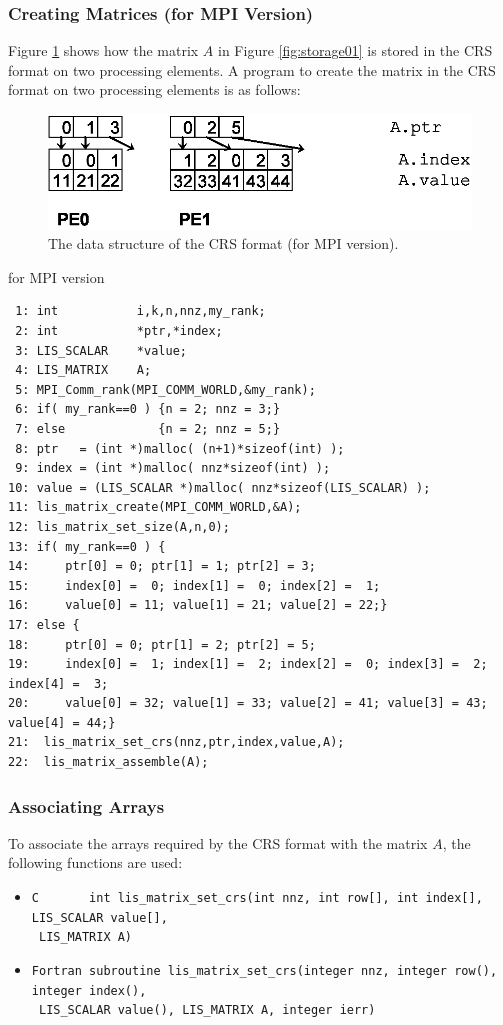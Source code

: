 \documentclass[a4paper]{article}
\begin{document}
\subsubsection{Creating Matrices (for MPI Version)}
Figure \ref{fig:storage01_mpi} shows how the matrix $A$ in 
Figure \ref{fig:storage01} is stored in the CRS format on two 
processing elements. A program to create the matrix in the CRS format 
on two processing elements is as follows:
\begin{figure}[h]
{\centering 
\includegraphics{storage01_mpi.eps} 
\caption{The data structure of the CRS format (for MPI version).}\label{fig:storage01_mpi}}
\end{figure}
\begin{itembox}[l]{for MPI version}
\small
\begin{verbatim}
 1: int           i,k,n,nnz,my_rank;
 2: int           *ptr,*index;
 3: LIS_SCALAR    *value;
 4: LIS_MATRIX    A;
 5: MPI_Comm_rank(MPI_COMM_WORLD,&my_rank);
 6: if( my_rank==0 ) {n = 2; nnz = 3;}
 7: else             {n = 2; nnz = 5;}
 8: ptr   = (int *)malloc( (n+1)*sizeof(int) );
 9: index = (int *)malloc( nnz*sizeof(int) );
10: value = (LIS_SCALAR *)malloc( nnz*sizeof(LIS_SCALAR) );
11: lis_matrix_create(MPI_COMM_WORLD,&A);
12: lis_matrix_set_size(A,n,0);
13: if( my_rank==0 ) {
14:     ptr[0] = 0; ptr[1] = 1; ptr[2] = 3;
15:     index[0] =  0; index[1] =  0; index[2] =  1;
16:     value[0] = 11; value[1] = 21; value[2] = 22;}
17: else {
18:     ptr[0] = 0; ptr[1] = 2; ptr[2] = 5;
19:     index[0] =  1; index[1] =  2; index[2] =  0; index[3] =  2; index[4] =  3;
20:     value[0] = 32; value[1] = 33; value[2] = 41; value[3] = 43; value[4] = 44;}
21:  lis_matrix_set_crs(nnz,ptr,index,value,A);
22:  lis_matrix_assemble(A);
\end{verbatim}
\end{itembox}
\subsubsection{Associating Arrays}
To associate the arrays required by the CRS format with the matrix $A$, the following functions are used:
\begin{itemize}
\item \verb|C       int lis_matrix_set_crs(int nnz, int row[], int index[], LIS_SCALAR value[],|\\
      \verb| LIS_MATRIX A)|
\item \verb|Fortran subroutine lis_matrix_set_crs(integer nnz, integer row(), integer index(),|\\
      \verb| LIS_SCALAR value(), LIS_MATRIX A, integer ierr)|
\end{itemize}
\newpage
\end{document}
